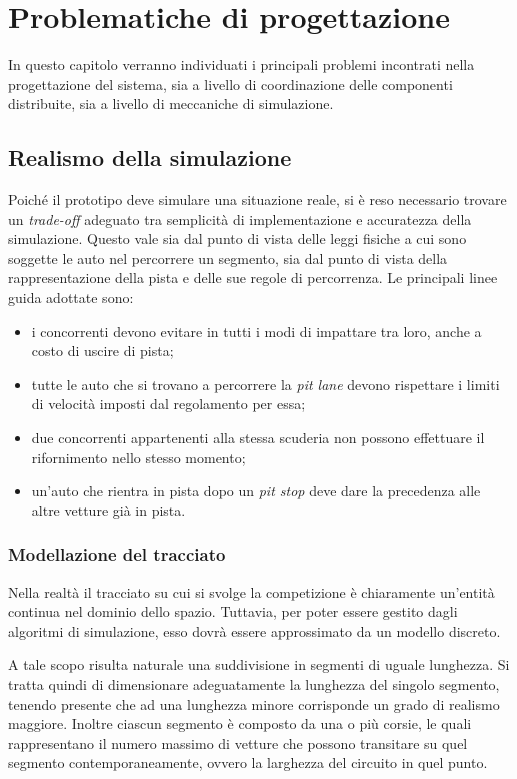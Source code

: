 \chapter{Problematiche di progettazione}

In questo capitolo verranno individuati i principali problemi incontrati nella progettazione del sistema, sia a livello di coordinazione delle componenti distribuite, sia a livello di meccaniche di simulazione.

\section{Realismo della simulazione}
Poiché il prototipo deve simulare una situazione reale, si è reso necessario trovare un \textit{trade-off} adeguato tra semplicità di implementazione e accuratezza della simulazione. Questo vale sia dal punto di vista delle leggi fisiche a cui sono soggette le auto nel percorrere un segmento, sia dal punto di vista della rappresentazione della pista e delle sue regole di percorrenza. Le principali linee guida adottate sono:
\begin{itemize}
\item i concorrenti devono evitare in tutti i modi di impattare tra loro, anche a costo di uscire di pista;
\item tutte le auto che si trovano a percorrere la \textit{pit lane} devono rispettare i limiti di velocità imposti dal regolamento per essa;
\item due concorrenti appartenenti alla stessa scuderia non possono effettuare il rifornimento nello stesso momento;
\item un'auto che rientra in pista dopo un \textit{pit stop} deve dare la precedenza alle altre vetture già in pista.
\end{itemize}

\subsection*{Modellazione del tracciato}
Nella realtà il tracciato su cui si svolge la competizione è chiaramente un'entità continua nel dominio dello spazio. Tuttavia, per poter essere gestito dagli algoritmi di simulazione, esso dovrà essere approssimato da un modello discreto.

A tale scopo risulta naturale una suddivisione in segmenti di uguale lunghezza. Si tratta quindi di dimensionare adeguatamente la lunghezza del singolo segmento, tenendo presente che ad una lunghezza minore corrisponde un grado di realismo maggiore. Inoltre ciascun segmento è composto da una o più corsie, le quali rappresentano il numero massimo di vetture che possono transitare su quel segmento contemporaneamente, ovvero la larghezza del circuito in quel punto.


